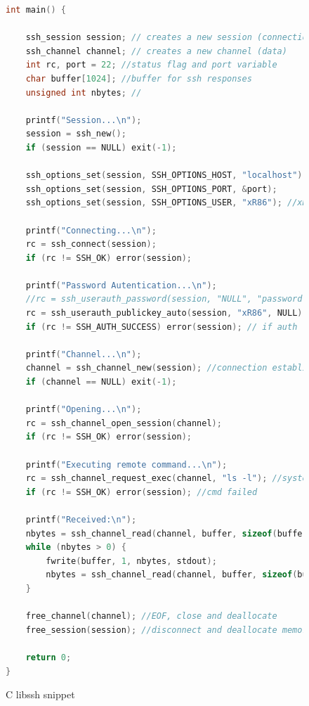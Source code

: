 \documentclass{llncs}
\begin{document}
\begin{figure}
\begin{lstlisting}[language=C]
int main() {

    ssh_session session; // creates a new session (connection)
    ssh_channel channel; // creates a new channel (data)
    int rc, port = 22; //status flag and port variable
    char buffer[1024]; //buffer for ssh responses
    unsigned int nbytes; //

    printf("Session...\n");
    session = ssh_new();
    if (session == NULL) exit(-1);

    ssh_options_set(session, SSH_OPTIONS_HOST, "localhost"); //localhost //192.168.100.2
    ssh_options_set(session, SSH_OPTIONS_PORT, &port);
    ssh_options_set(session, SSH_OPTIONS_USER, "xR86"); //xR86 //labsi

    printf("Connecting...\n");
    rc = ssh_connect(session);
    if (rc != SSH_OK) error(session);

    printf("Password Autentication...\n");
    //rc = ssh_userauth_password(session, "NULL", "password"); // second is username, third is password
    rc = ssh_userauth_publickey_auto(session, "xR86", NULL); //automatically looks in .ssh/ keys
    if (rc != SSH_AUTH_SUCCESS) error(session); // if auth fails, the program stops here

    printf("Channel...\n");
    channel = ssh_channel_new(session); //connection established
    if (channel == NULL) exit(-1);

    printf("Opening...\n");
    rc = ssh_channel_open_session(channel);
    if (rc != SSH_OK) error(session);

    printf("Executing remote command...\n");
    rc = ssh_channel_request_exec(channel, "ls -l"); //system call in remote machine
    if (rc != SSH_OK) error(session); //cmd failed

    printf("Received:\n");
    nbytes = ssh_channel_read(channel, buffer, sizeof(buffer), 0);
    while (nbytes > 0) {
        fwrite(buffer, 1, nbytes, stdout);
        nbytes = ssh_channel_read(channel, buffer, sizeof(buffer), 0);
    }

    free_channel(channel); //EOF, close and deallocate
    free_session(session); //disconnect and deallocate memory

    return 0;
}
\end{lstlisting}
	\centering
	\caption{C libssh snippet}
\end{figure}


\FloatBarrier
\end{document}
